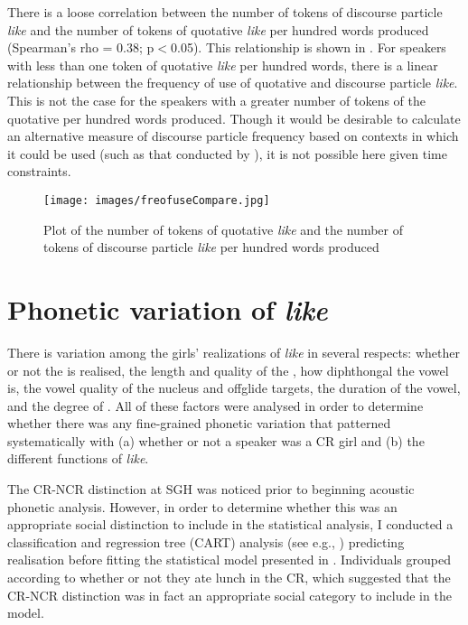 \largerpage
There is a loose correlation between the number of tokens of discourse particle \textit{like} and the number of tokens of quotative \textit{like} per hundred words produced (Spearman's rho = 0.38; p$<$0.05). This relationship is shown in . For speakers with less than one token of quotative \textit{like} per hundred words, there is a linear relationship between the frequency of use of quotative and discourse particle \textit{like}. This is not the case for the speakers with a greater number of tokens of the quotative per hundred words produced. Though it would be desirable to calculate an alternative measure of discourse particle frequency based on contexts in which it could be used (such as that conducted by \citealt{darcy2005}), it is not possible here given time constraints. 

\clearpage
\begin{figure} 
	\centering
		\texttt{[image: images/freofuseCompare.jpg]}
	\caption{Plot of the number of tokens of quotative \textit{like} and the number of tokens of discourse particle \textit{like} per hundred words produced}
	\label{fig:ComparingQDP}
\end{figure}



\section{Phonetic variation of \textit{like}}\label{sec:phoneticlike}

There is variation among the girls' realizations of \textit{like} in several respects: whether or not the  is realised, the length and quality of the , how diphthongal the vowel is, the vowel quality of the nucleus and offglide targets, the duration of the vowel, and the degree of . All of these factors were analysed in order to determine whether there was any fine-grained phonetic variation that patterned systematically with (a) whether or not a speaker was a CR girl and (b) the different functions of \textit{like}. 


The CR-NCR distinction at SGH was noticed prior to beginning acoustic phonetic analysis. However, in order to determine whether this was an appropriate social distinction to include in the statistical analysis, I conducted a classification and regression tree (CART) analysis (see e.g., \citealt{breimanetal1984}) predicting  realisation before fitting the statistical model presented in . Individuals grouped according to whether or not they ate lunch in the CR, which suggested that the CR-NCR distinction was in fact an appropriate social category to include in the model. \nocite{breimanetal1984}



